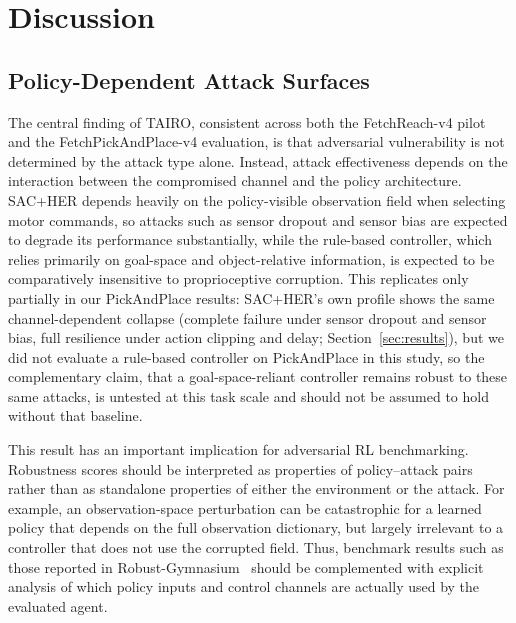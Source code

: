 \documentclass[conference]{IEEEtran}
\begin{document}
\section{Discussion}
\label{sec:discussion}

\subsection{Policy-Dependent Attack Surfaces}

The central finding of TAIRO, consistent across both the FetchReach-v4 pilot and the
FetchPickAndPlace-v4 evaluation, is that adversarial vulnerability is not determined by
the attack type alone. Instead, attack effectiveness depends on the interaction between
the compromised channel and the policy architecture. SAC+HER depends heavily on the
policy-visible observation field when selecting motor commands, so attacks such as
sensor dropout and sensor bias are expected to degrade its performance substantially,
while the rule-based controller, which relies primarily on goal-space and
object-relative information, is expected to be comparatively insensitive to
proprioceptive corruption. This replicates only partially in our PickAndPlace results:
SAC+HER's own profile shows the same channel-dependent collapse (complete failure
under sensor dropout and sensor bias, full resilience under action clipping and delay;
Section~\ref{sec:results}), but we did not evaluate a rule-based controller on
PickAndPlace in this study, so the complementary claim, that a goal-space-reliant
controller remains robust to these same attacks, is untested at this task scale and
should not be assumed to hold without that baseline.

This result has an important implication for adversarial RL benchmarking. Robustness
scores should be interpreted as properties of policy--attack pairs rather than as
standalone properties of either the environment or the attack. For example, an
observation-space perturbation can be catastrophic for a learned policy that depends on
the full observation dictionary, but largely irrelevant to a controller that does not
use the corrupted field. Thus, benchmark results such as those reported in
Robust-Gymnasium~\cite{gu2025robustgymnasium} should be complemented with explicit
analysis of which policy inputs and control channels are actually used by the evaluated
agent.
\end{document}
